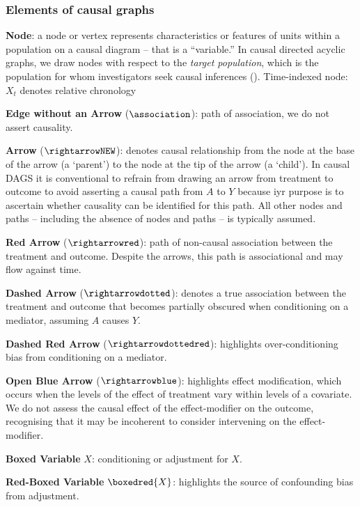 \documentclass[
  single column]{article}
\begin{document}
\subsubsection{Elements of causal
graphs}\label{elements-of-causal-graphs}

\textbf{Node}: a node or vertex represents characteristics or features
of units within a population on a causal diagram -- that is a
``variable.'' In causal directed acyclic graphs, we draw nodes with
respect to the \emph{target population}, which is the population for
whom investigators seek causal inferences
(). Time-indexed
node: \(X_t\) denotes relative chronology

\textbf{Edge without an Arrow} (\(\association\)): path of association,
we do not assert causality.

\textbf{Arrow} (\(\rightarrowNEW\)): denotes causal relationship from
the node at the base of the arrow (a `parent') to the node at the tip of
the arrow (a `child'). In causal DAGS it is conventional to refrain from
drawing an arrow from treatment to outcome to avoid asserting a causal
path from \(A\) to \(Y\) because iyr purpose is to ascertain whether
causality can be identified for this path. All other nodes and paths --
including the absence of nodes and paths -- is typically assumed.

\textbf{Red Arrow} (\(\rightarrowred\)): path of non-causal association
between the treatment and outcome. Despite the arrows, this path is
associational and may flow against time.

\textbf{Dashed Arrow} (\(\rightarrowdotted\)): denotes a true
association between the treatment and outcome that becomes partially
obscured when conditioning on a mediator, assuming \(A\) causes \(Y\).

\textbf{Dashed Red Arrow} (\(\rightarrowdottedred\)): highlights
over-conditioning bias from conditioning on a mediator.

\textbf{Open Blue Arrow} (\(\rightarrowblue\)): highlights effect
modification, which occurs when the levels of the effect of treatment
vary within levels of a covariate. We do not assess the causal effect of
the effect-modifier on the outcome, recognising that it may be
incoherent to consider intervening on the effect-modifier.

\textbf{Boxed Variable} \(\boxed{X}\): conditioning or adjustment for
\(X\).

\textbf{Red-Boxed Variable} \(\boxedred{X}\): highlights the source of
confounding bias from adjustment.
\end{document}
